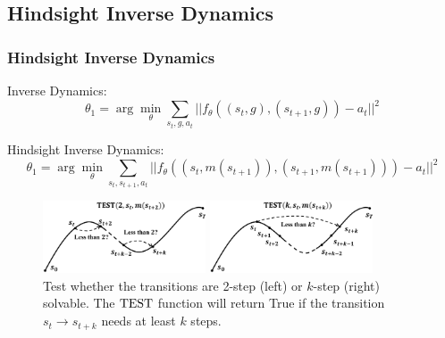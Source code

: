 \documentclass[10pt,hyperref={CJKbookmarks=true},envcountsect,mathserif]{beamer}
\begin{document}
\subsection{Hindsight Inverse Dynamics}
\begin{frame}
	\frametitle{Hindsight Inverse Dynamics}
	Inverse Dynamics:
	\begin{equation}
	\label{eq_id}
	\theta_1 = \arg\min_\theta
	\sum_{s_t,g,a_t}||f_\theta((s_t,g),(s_{t+1},g))-a_t||^2
	\end{equation}


	Hindsight Inverse Dynamics:
	\begin{equation}
	\label{eq_hid}
	\theta_1 = \arg\min_\theta
	\sum_{s_t,s_{t+1},a_t}||f_\theta((s_t,m(s_{t+1})),(s_{t+1},m(s_{t+1})))-a_t||^2
	\end{equation}
		\begin{figure}[tbp]
	
		\begin{minipage}[t]{0.5\linewidth}
			\centering
			\includegraphics[width=1.9in]{figures/1step.pdf}
		\end{minipage}%
		\begin{minipage}[t]{0.5\linewidth}
			\centering
			\includegraphics[width=1.9in]{figures/kstep.pdf}
			
		\end{minipage}
		
		\caption{Test whether the transitions are 2-step (left) or $k$-step (right) solvable. The ${\rm TEST}$ function will return True if the transition $s_t\to s_{t+k}$ needs at least $k$ steps.}
		\vspace{-0.1cm}
		\label{figkstep}
	\end{figure}
	
	
\end{frame}
\end{document}
